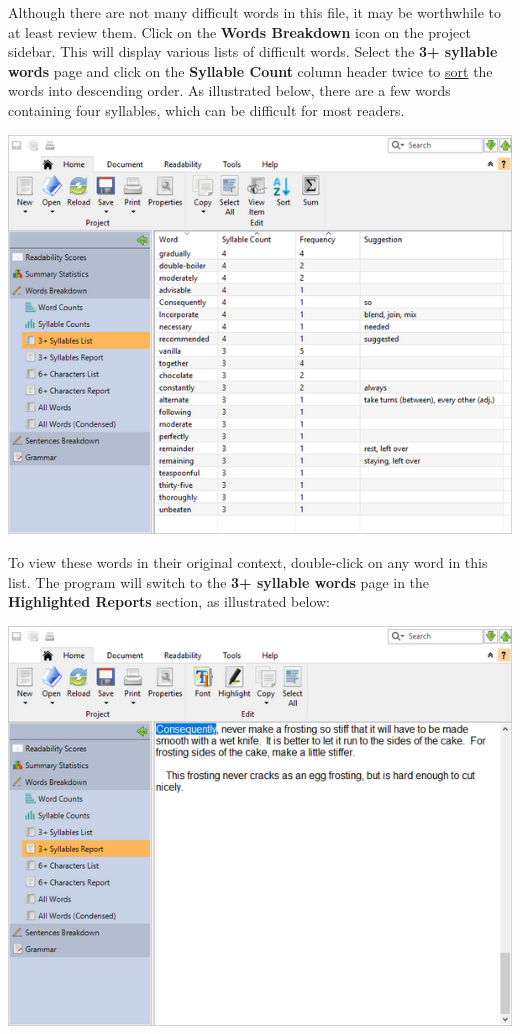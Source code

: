 \documentclass[
]{book}
\theoremstyle{definition}
\theoremstyle{definition}
\theoremstyle{definition}
\theoremstyle{definition}
\theoremstyle{remark}
\begin{document}
Although there are not many difficult words in this file, it may be worthwhile to at least review them. Click on the \textbf{Words Breakdown} icon on the project sidebar. This will display various lists of difficult words. Select the \textbf{3+ syllable words} page and click on the \textbf{Syllable Count} column header twice to \protect\hyperlink{column-sorting}{sort} the words into descending order. As illustrated below, there are a few words containing four syllables, which can be difficult for most readers.

\includegraphics{Images/exampledifficultwords.png}

To view these words in their original context, double-click on any word in this list. The program will switch to the \textbf{3+ syllable words} page in the \textbf{Highlighted Reports} section, as illustrated below:

\includegraphics{Images/difficultwordselected.png}
\end{document}
